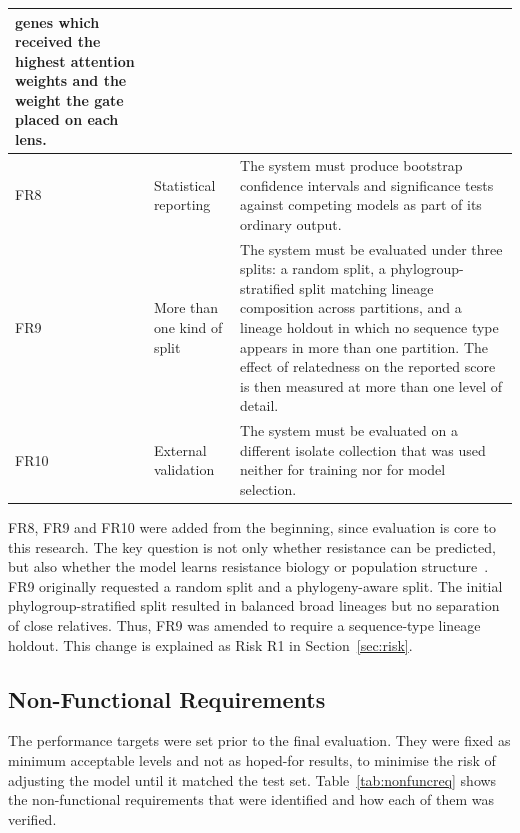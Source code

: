 {\begin{longtable}{|l|>{\raggedright\arraybackslash}p{3.0cm}|>{\raggedright\arraybackslash}p{9.8cm}|}
genes which received the highest attention weights and the weight the gate placed on each
lens. \\
\hline
FR8 & Statistical reporting &
The system must produce bootstrap confidence intervals and significance tests against
competing models as part of its ordinary output. \\
\hline
FR9 & More than one kind of split &
The system must be evaluated under three splits: a random split, a phylogroup-stratified split
matching lineage composition across partitions, and a lineage holdout in which no sequence
type appears in more than one partition. The effect of relatedness on the reported score is
then measured at more than one level of detail. \\
\hline
FR10 & External validation &
The system must be evaluated on a different isolate collection that was used neither for
training nor for model selection. \\
\end{longtable}}

FR8, FR9 and FR10 were added from the beginning, since evaluation is core to this research. The
key question is not only whether resistance can be predicted, but also whether the model learns
resistance biology or population structure~\cite{Yu2025}. FR9 originally requested a random
split and a phylogeny-aware split. The initial phylogroup-stratified split resulted in balanced
broad lineages but no separation of close relatives. Thus, FR9 was amended to require a
sequence-type lineage holdout. This change is explained as Risk R1 in Section~\ref{sec:risk}.

\subsection{Non-Functional Requirements}

The performance targets were set prior to the final evaluation. They were fixed as minimum
acceptable levels and not as hoped-for results, to minimise the risk of adjusting the model
until it matched the test set. Table~\ref{tab:nonfuncreq} shows the non-functional requirements
that were identified and how each of them was verified.

